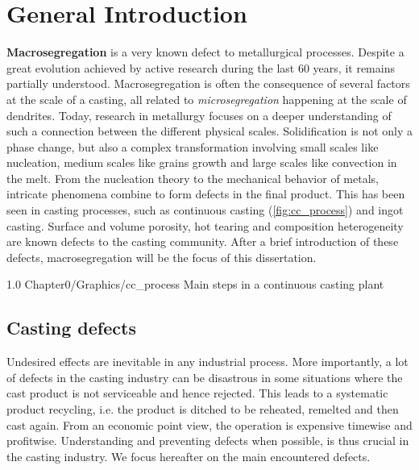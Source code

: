 \chapter{General Introduction}
\textbf{Macrosegregation} is a very known defect to metallurgical processes. Despite a great evolution achieved by active research during the last 60 years,
it remains partially understood. Macrosegregation is often  the consequence of several factors at the scale of a casting, all related to \emph{microsegregation} happening at the scale
of dendrites. Today, research in metallurgy focuses on a deeper understanding of such a connection between the different physical scales.
Solidification is not only a phase change, but also a complex transformation involving small scales like nucleation, medium scales
like grains growth and large scales like convection in the melt. From the nucleation theory to the mechanical behavior of metals, intricate phenomena combine to form defects in the final product. This has been seen in casting processes, such as continuous casting (\cref{fig:cc_process}) and ingot casting. Surface and volume porosity, hot tearing and composition heterogeneity are known defects to the casting community. After a brief introduction of these defects, macrosegregation will be the focus of this dissertation. 

\begin{figureth}
{1.0}
{Chapter0/Graphics/cc_process}
{Main steps in a continuous casting plant}
\label{fig:cc_process}
\end{figureth}
\section{Casting defects}
Undesired effects are inevitable in any industrial process. More importantly, a lot of defects in the casting industry can be disastrous in some situations where the cast product is not serviceable and hence rejected. This leads to a systematic product recycling, i.e. the product is ditched to be reheated, remelted and then cast again. From an economic point view, the operation is expensive timewise and profitwise. Understanding and preventing defects when possible, is thus crucial in the casting industry. We focus hereafter on the main encountered defects.
